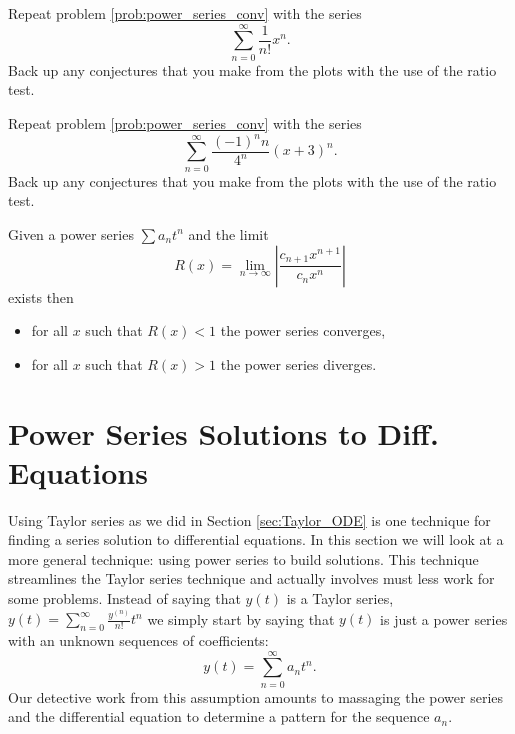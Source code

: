 \begin{problem}
    Repeat problem \ref{prob:power_series_conv} with the series
    \[ \sum_{n=0}^\infty \frac{1}{n!} x^n. \]
    Back up any conjectures that you make from the plots with the use of the ratio test.
\end{problem}

\begin{problem}
    Repeat problem \ref{prob:power_series_conv} with the series
    \[ \sum_{n=0}^\infty \frac{(-1)^n n}{4^n} (x+3)^n. \]
    Back up any conjectures that you make from the plots with the use of the ratio test.
\end{problem}



\begin{thm}
    Given a power series $\sum a_n t^n$ and the limit
    \[ R(x) = \lim_{n \to \infty} \left| \frac{c_{n+1}x^{n+1}}{c_{n}x^n} \right| \]
    exists then
    \begin{itemize}
        \item for all $x$ such that $R(x) < 1$ the power series converges,
        \item for all $x$ such that $R(x) > 1$ the power series diverges.
    \end{itemize}
\end{thm}


\section{Power Series Solutions to Diff. Equations}
Using Taylor series as we did in Section \ref{sec:Taylor_ODE} is one technique for finding
a series solution to differential equations.  In this section we will look at a more
general technique: using power series to build solutions.  This technique streamlines the
Taylor series technique and actually involves must less work for some problems.  
Instead of
saying that $y(t)$ is a Taylor series, $y(t) = \sum_{n=0}^\infty \frac{y^{(n)}}{n!} t^n$
we simply start by saying that $y(t)$ is just a power series with an unknown sequences of
coefficients: 
\[ y(t) = \sum_{n=0}^\infty a_n t^n. \]  
Our detective work from this assumption amounts to massaging the power series and the
differential equation to determine a pattern for the sequence $a_n$.


